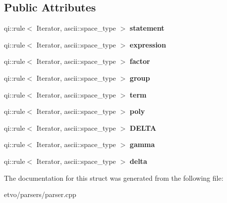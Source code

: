 \subsection*{Public Attributes}
\begin{DoxyCompactItemize}
\item 
\mbox{\label{structparseptg_1_1calculator_a53fdb55e2e860d17fcd42bf20129a5e7}} 
qi\+::rule$<$ Iterator, ascii\+::space\+\_\+type $>$ {\bfseries statement}
\item 
\mbox{\label{structparseptg_1_1calculator_a2142525e58cfcbe60bff5e57fade375a}} 
qi\+::rule$<$ Iterator, ascii\+::space\+\_\+type $>$ {\bfseries expression}
\item 
\mbox{\label{structparseptg_1_1calculator_afde38ac64ef71f3107194a8ebef12ebf}} 
qi\+::rule$<$ Iterator, ascii\+::space\+\_\+type $>$ {\bfseries factor}
\item 
\mbox{\label{structparseptg_1_1calculator_abc10ee28c6611f001d682ee0dec3a236}} 
qi\+::rule$<$ Iterator, ascii\+::space\+\_\+type $>$ {\bfseries group}
\item 
\mbox{\label{structparseptg_1_1calculator_a275331a2b5012b1fa282e13c5c278297}} 
qi\+::rule$<$ Iterator, ascii\+::space\+\_\+type $>$ {\bfseries term}
\item 
\mbox{\label{structparseptg_1_1calculator_a521dd00ceeb3839f1080f175f115c9ef}} 
qi\+::rule$<$ Iterator, ascii\+::space\+\_\+type $>$ {\bfseries poly}
\item 
\mbox{\label{structparseptg_1_1calculator_aaad87741e619d05ad584a29ca40a0b1a}} 
qi\+::rule$<$ Iterator, ascii\+::space\+\_\+type $>$ {\bfseries D\+E\+L\+TA}
\item 
\mbox{\label{structparseptg_1_1calculator_a5011dc3c707b95a3b3173f945740a730}} 
qi\+::rule$<$ Iterator, ascii\+::space\+\_\+type $>$ {\bfseries gamma}
\item 
\mbox{\label{structparseptg_1_1calculator_af4d4ed2e90c85f166ffc2c84bb38c376}} 
qi\+::rule$<$ Iterator, ascii\+::space\+\_\+type $>$ {\bfseries delta}
\end{DoxyCompactItemize}


The documentation for this struct was generated from the following file\+:\begin{DoxyCompactItemize}
\item 
etvo/parsers/parser.\+cpp\end{DoxyCompactItemize}

